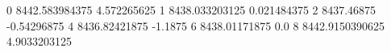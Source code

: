 0 8442.583984375 4.572265625
1 8438.033203125 0.021484375
2 8437.46875 -0.54296875
4 8436.82421875 -1.1875
6 8438.01171875 0.0
8 8442.9150390625 4.9033203125
